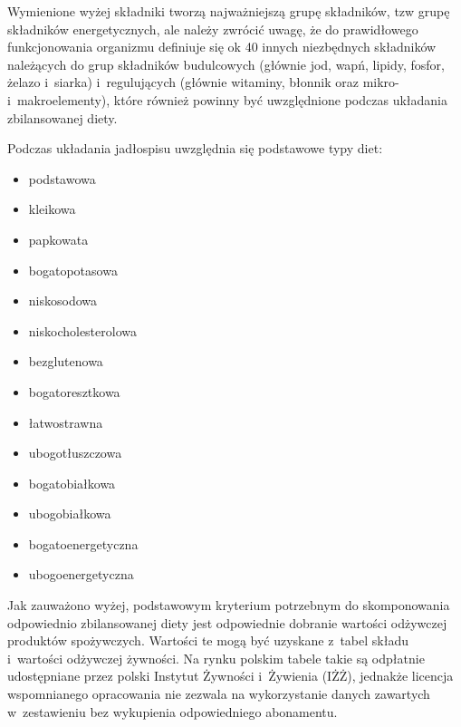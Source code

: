 Wymienione wyżej składniki tworzą najważniejszą grupę składników, tzw grupę składników energetycznych, ale należy zwrócić uwagę,
że do prawidłowego funkcjonowania organizmu definiuje się ok 40 innych niezbędnych składników należących do grup składników budulcowych
(głównie jod, wapń, lipidy, fosfor, żelazo i~siarka) i~regulujących (głównie witaminy, błonnik oraz mikro- i~makroelementy),
które również powinny być uwzględnione podczas układania zbilansowanej diety\cite{book:dietetyka-zywienie-zdrowego-i-chorego-czlowieka}.

\par
Podczas układania jadłospisu uwzględnia się podstawowe typy diet\cite{book:dietoterapia}:
\begin{itemize}
    \item podstawowa
    \item kleikowa
    \item papkowata
    \item bogatopotasowa
    \item niskosodowa
    \item niskocholesterolowa
    \item bezglutenowa
    \item bogatoresztkowa
    \item łatwostrawna
    \item ubogotłuszczowa
    \item bogatobiałkowa
    \item ubogobiałkowa
    \item bogatoenergetyczna
    \item ubogoenergetyczna
\end{itemize}

\par
Jak zauważono wyżej, podstawowym kryterium potrzebnym do skomponowania odpowiednio zbilansowanej diety jest odpowiednie dobranie wartości odżywczej produktów spożywczych.
Wartości te mogą być uzyskane z~tabel składu i~wartości odżywczej żywności.
Na rynku polskim tabele takie są odpłatnie udostępniane przez polski Instytut Żywności i~Żywienia (IŻŻ)\cite{book:tabele-wartosci-odzywczych},
jednakże licencja wspomnianego opracowania nie zezwala na wykorzystanie danych zawartych w~zestawieniu bez wykupienia odpowiedniego abonamentu\cite{url:izz-dostep-do-bazy}.

